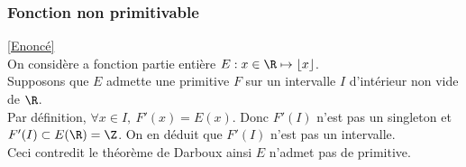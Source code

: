\documentclass{book}
\begin{document}
	\subsubsection{Fonction non primitivable }
	\label{Fonction non primitivable corrigé}
	\textcolor{blue}{\hyperref[Fonction non primitivable]{[Enoncé]}}\\
	On considère a fonction partie entière $E:x\in \R\mapsto \lfloor x\rfloor$.\\
	Supposons que $E$ admette une primitive $F$ sur un intervalle $I$ d'intérieur non vide de $\R$.\\
	Par définition, $\forall x\in I,\ F'(x)=E(x)$. Donc $F'(I)$ n'est pas un singleton et $F'(I)\subset E(\R)=\Z$. On en déduit que $F'(I)$ n'est pas un intervalle.\\
	Ceci contredit le théorème de Darboux ainsi $E$ n'admet pas de primitive.
	
\end{document}
